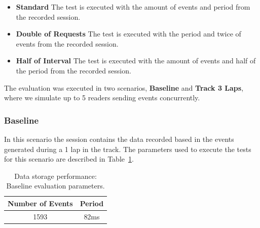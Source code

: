 \begin{itemize}
  \item\textbf{Standard} The test is executed with the amount of events and period from the recorded session.
  \item\textbf{Double of Requests} The test is executed with the period and twice of events from the recorded
  session.
  \item\textbf{Half of Interval} The test is executed with the amount of events and half of the period from
  the recorded session.
\end{itemize}

The evaluation was executed in two scenarios, \textbf{Baseline} and \textbf{Track 3 Laps}, where we
simulate up to 5 readers sending events concurrently.

\subsubsection{Baseline}
\label{subs:eval_exp_data_baseline}
In this scenario the session contains the data recorded based in the events generated during a 1 lap
in the track. The parameters used to execute the tests for this scenario are described in Table~\ref{tab:baseline_parameters}.

\begin{table}[ht!]
  \begin{tabular}{|c|c|}
    \hline
    Number of Events & Period \\ \hline
    1593             & 82ms   \\ \hline
  \end{tabular}
  \caption[Data storage: Baseline evaluation parameters.]{Data storage performance: Baseline evaluation parameters.}
  \label{tab:baseline_parameters}
\end{table}

